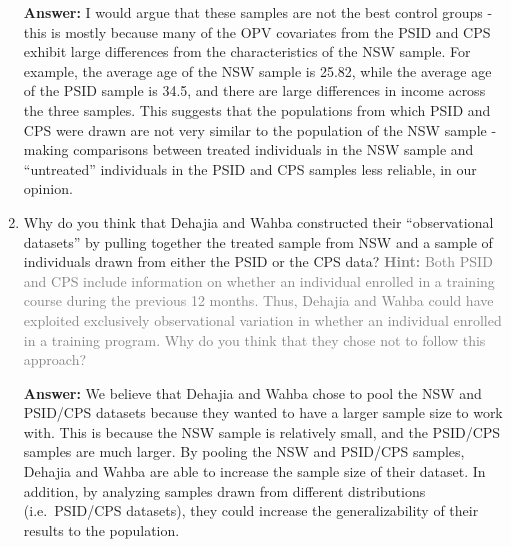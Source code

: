 \documentclass[
]{article}
\begin{document}
\begin{enumerate}
  \textbf{Answer:} I would argue that these samples are not the best
  control groups - this is mostly because many of the OPV covariates
  from the PSID and CPS exhibit large differences from the
  characteristics of the NSW sample. For example, the average age of the
  NSW sample is 25.82, while the average age of the PSID sample is 34.5,
  and there are large differences in income across the three samples.
  This suggests that the populations from which PSID and CPS were drawn
  are not very similar to the population of the NSW sample - making
  comparisons between treated individuals in the NSW sample and
  ``untreated'' individuals in the PSID and CPS samples less reliable,
  in our opinion.
\item
  Why do you think that Dehajia and Wahba constructed their
  ``observational datasets'' by pulling together the treated sample from
  NSW and a sample of individuals drawn from either the PSID or the CPS
  data?
  \textcolor{gray}{\textbf{Hint:} Both PSID and CPS include information on whether an individual enrolled in a training course during the previous 12 months. Thus, Dehajia and Wahba could have exploited exclusively observational variation in whether an individual enrolled in a training program. Why do you think that they chose not to follow this approach?}

  \textbf{Answer:} We believe that Dehajia and Wahba chose to pool the
  NSW and PSID/CPS datasets because they wanted to have a larger sample
  size to work with. This is because the NSW sample is relatively small,
  and the PSID/CPS samples are much larger. By pooling the NSW and
  PSID/CPS samples, Dehajia and Wahba are able to increase the sample
  size of their dataset. In addition, by analyzing samples drawn from
  different distributions (i.e.~PSID/CPS datasets), they could increase
  the generalizability of their results to the population.
\end{enumerate}



\pagebreak
\end{document}
